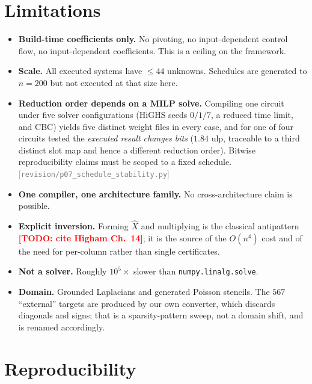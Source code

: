 \documentclass[11pt]{article}
\newcommand{\src}[1]{{\footnotesize\textcolor{gray}{[\texttt{#1}]}}}
\newcommand{\todo}[1]{\textcolor{red}{\textbf{[TODO: #1]}}}
\begin{document}
\section{Limitations}\label{sec:limitations}

\begin{itemize}
\item \textbf{Build-time coefficients only.} No pivoting, no input-dependent
control flow, no input-dependent coefficients. This is a ceiling on the
framework.
\item \textbf{Scale.} All executed systems have $\le 44$ unknowns. Schedules are
generated to $n=200$ but not executed at that size here.
\item \textbf{Reduction order depends on a MILP solve.} Compiling one circuit
under five solver configurations (HiGHS seeds $0/1/7$, a reduced time limit, and
CBC) yields five distinct weight files in every case, and for one of four
circuits tested the \emph{executed result changes bits} ($1.84$ ulp, traceable to
a third distinct slot map and hence a different reduction order). Bitwise
reproducibility claims must be scoped to a fixed schedule.
\src{revision/p07\_schedule\_stability.py}
\item \textbf{One compiler, one architecture family.} No cross-architecture claim
is possible.
\item \textbf{Explicit inversion.} Forming $\hat X$ and multiplying is the
classical antipattern \todo{cite Higham Ch.~14}; it is the source of the $O(n^4)$
cost and of the need for per-column rather than single certificates.
\item \textbf{Not a solver.} Roughly $10^5\times$ slower than
\texttt{numpy.linalg.solve}.
\item \textbf{Domain.} Grounded Laplacians and generated Poisson stencils. The
$567$ ``external'' targets are produced by our own converter, which discards
diagonals and signs; that is a sparsity-pattern sweep, not a domain shift, and is
renamed accordingly.
\end{itemize}

\section*{Reproducibility}
\end{document}
